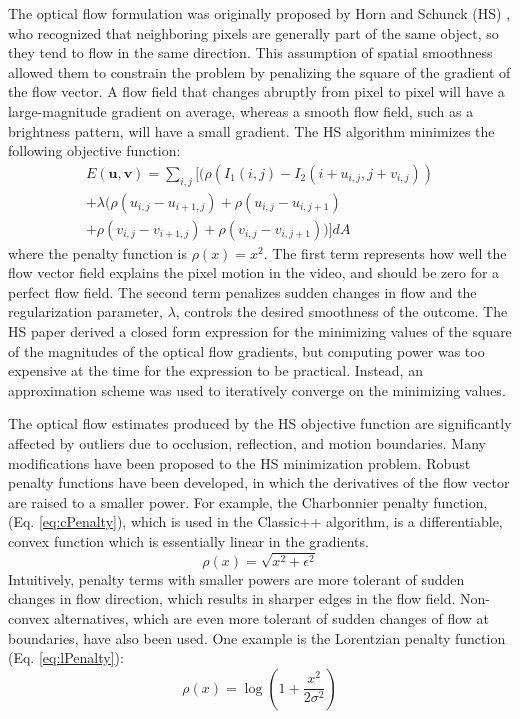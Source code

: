 \documentclass[10pt,twocolumn,letterpaper]{article}
\begin{document}
The optical flow formulation was originally proposed by Horn and Schunck (HS) \cite{horn}, who recognized that neighboring pixels are generally part of the same object, so they tend to flow in the same direction. This assumption of spatial smoothness allowed them to constrain the problem by penalizing the square of the gradient of the flow vector. A flow field that changes abruptly from pixel to pixel will have a large-magnitude gradient on average, whereas a smooth flow field, such as a brightness pattern, will have a small gradient. The HS algorithm minimizes the following objective function:
\begin{multline} \label{eq:hsObj}
E( \mathbf{u}, \mathbf{v}) = \sum\limits_{i,j} [(\rho(I_1(i,j) - I_2(i+u_{i,j},j+v_{i,j})) \\ 
+ \lambda (\rho(u_{i,j}-u_{i+1,j}) + \rho(u_{i,j}-u_{i,j+1}) \\ 
+ \rho(v_{i,j}-v_{i+1,j}) +  \rho(v_{i,j}-v_{i,j+1}))]dA
\end{multline}
where the penalty function is $\rho(x) = x^2$. The first term represents how well the flow vector field explains the pixel motion in the video, and should be zero for a perfect flow field. The second term penalizes sudden changes in flow and the regularization parameter, $\lambda$, controls the desired smoothness of the outcome. The HS paper derived a closed form expression for the minimizing values of the square of the magnitudes of the optical flow gradients, but computing power was too expensive at the time for the expression to be practical. Instead, an approximation scheme was used to iteratively converge on the minimizing values.

The optical flow estimates produced by the HS objective function are significantly affected by outliers due to occlusion, reflection, and motion boundaries. Many modifications have been proposed to the HS minimization problem. Robust penalty functions have been developed, in which the derivatives of the flow vector are raised to a smaller power. For example, the Charbonnier penalty function, (Eq. \ref{eq:cPenalty}), which is used in the Classic++ algorithm, is a differentiable, convex function which is essentially linear in the gradients. 
\begin{equation} \label{eq:cPenalty}
\rho(x) = \sqrt{x^2 + \epsilon^2}
\end{equation}
Intuitively, penalty terms with smaller powers are more tolerant of sudden changes in flow direction, which results in sharper edges in the flow field. Non-convex alternatives, which are even more tolerant of sudden changes of flow at boundaries, have also been used.  One example is the Lorentzian penalty function (Eq. \ref{eq:lPenalty}):
\begin{equation} \label{eq:lPenalty}
\rho(x) = \log(1 + \frac{x^2}{2\sigma^2})
\end{equation}
\end{document}
